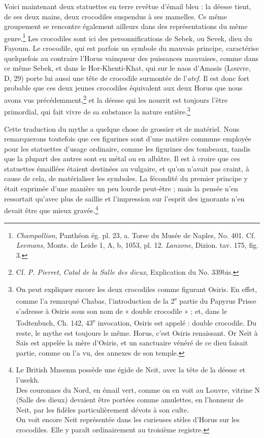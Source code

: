 \documentclass[letterpaper,twocolumn,openany,nodeprecatedcode]{dndbook}
\begin{document}
Voici maintenant deux statuettes en terre revêtue d'émail bleu : la déesse tient, de ses deux mains, deux crocodiles suspendus à ses mamelles. Ce même groupement se rencontre également ailleurs dans des représentations du même genre.\footnote{\emph{Champollion}, Panthéon ég. pl. 23, a. Torse du Musée de Naples, No. 401. Cf. \emph{Leemans}, Monts. de Leide 1, A, b, 1053, pl. 12. \emph{Lanzone}, Dizion. tav. 175, fig. 3.} Les crocodiles sont ici des personnifications de Sebek, ou Sevek, dieu du Fayoum. Le crocodile, qui est parfois un symbole du mauvais principe, caractérise quelquefois au contraire l'Horus vainqueur des puissances mauvaises, comme dans ce même Sebek, et dans le Hor-Khenti-Khat, qui sur le naos d'Amasis (Louvre, D, 29) porte lui aussi une tête de crocodile surmontée de l'\emph{atef}. Il est donc fort probable que ces deux jeunes crocodiles équivalent aux deux Horus que nous avons vus précédemment,\footnote{Cf. \emph{P. Pierret}, \emph{Catal de la Salle des dieux}, Explication du No. 339bis.} et la déesse qui les nourrit est toujours l'être primordial, qui fait vivre de sa substance la nature entière.\footnote{On peut expliquer encore les deux crocodiles comme figurant Osiris. En effet, comme l'a remarqué Chabas, l'introduction de la 2\textsuperscript{e} partie du Papyrus Prisse s'adresse à Osiris sous son nom de « double crocodile » ; et, dans le Todtenbuch, Ch. 142, 43\textsuperscript{e} invocation, Osiris est appelé : double crocodile. Du reste, le mythe est toujours le même. Horus, c'est Osiris renaissant. Or Neit à Saïs est appelée la mère d'Osiris, et un sanctuaire vénéré de ce dieu faisait partie, comme on l'a vu, des annexes de son temple.}

Cette traduction du mythe a quelque chose de grossier et de matériel. Nous remarquerons toutefois que ces figurines sont d'une matière commune employée pour les statuettes d'usage ordinaire, comme les figurines des tombeaux, tandis que la plupart des autres sont en métal ou en albâtre. Il est à croire que ces statuettes émaillées étaient destinées au vulgaire, et qu'on n'avait pas craint, à cause de cela, de matérialiser les symboles. La fécondité du premier principe y était exprimée d'une manière un peu lourde peut-être ; mais la pensée n'en ressortait qu'avec plus de saillie et l'impression sur l'esprit des ignorants n'en devait être que mieux gravée.\footnote{Le British Mnsenm possède une égide de Neit, avec la tête de la déesse et l'usekh.\\\hspace*{5mm}Des couronnes du Nord, en émail vert, comme on en voit au Louvre, vitrine N (Salle des dieux) devaient être portées comme amulettes, en l'honneur de Neit, par les fidèles particulièrement dévots à son culte.\\\hspace*{5mm}On voit encore Neit représentée dans les curieuses stèles d'Horus sur les crocodiles. Elle y paraît ordinairement au troisième registre.}
\end{document}
